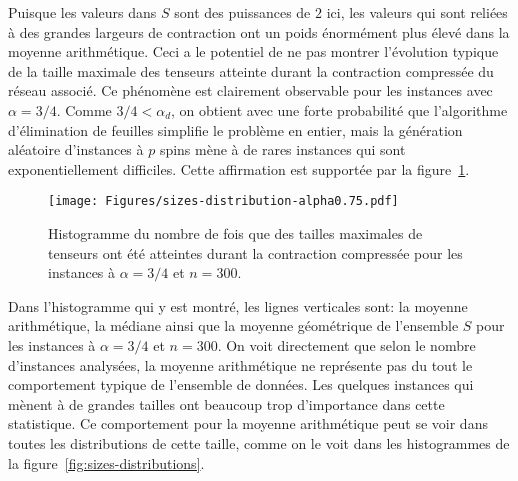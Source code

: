 Puisque les valeurs dans $S$ sont des puissances de $2$ ici, les valeurs qui sont reliées à des grandes largeurs de contraction ont un poids énormément plus élevé dans la moyenne arithmétique.
Ceci a le potentiel de ne pas montrer l'évolution typique de la taille maximale des tenseurs atteinte durant la contraction compressée du réseau associé.
Ce phénomène est clairement observable pour les instances avec $\alpha = 3/4$.
Comme $3/4 < \alpha_d$, on obtient avec une forte probabilité que l'algorithme d'élimination de feuilles simplifie le problème en entier, mais la génération aléatoire d'instances à $p$ spins mène à de rares instances qui sont exponentiellement difficiles.
Cette affirmation est supportée par la figure~\ref{fig:sizes-distribution}.
\begin{figure}[h]
    \centering
    \texttt{[image: Figures/sizes-distribution-alpha0.75.pdf]}
    \caption[Histogramme du nombre de fois que des tailles maximales de tenseurs ont été atteintes à $\alpha = 3/4$ et à $n = 300$.]{Histogramme du nombre de fois que des tailles maximales de tenseurs ont été atteintes durant la contraction compressée pour les instances à $\alpha = 3/4$ et $n = 300$.}
    \label{fig:sizes-distribution}
\end{figure}
Dans l'histogramme qui y est montré, les lignes verticales sont: la moyenne arithmétique, la médiane ainsi que la moyenne géométrique de l'ensemble $S$ pour les instances à $\alpha = 3/4$ et $n = 300$.
On voit directement que selon le nombre d'instances analysées, la moyenne arithmétique ne représente pas du tout le comportement typique de l'ensemble de données.
Les quelques instances qui mènent à de grandes tailles ont beaucoup trop d'importance dans cette statistique.
Ce comportement pour la moyenne arithmétique peut se voir dans toutes les distributions de cette taille, comme on le voit dans les histogrammes de la figure~\ref{fig:sizes-distributions}.

